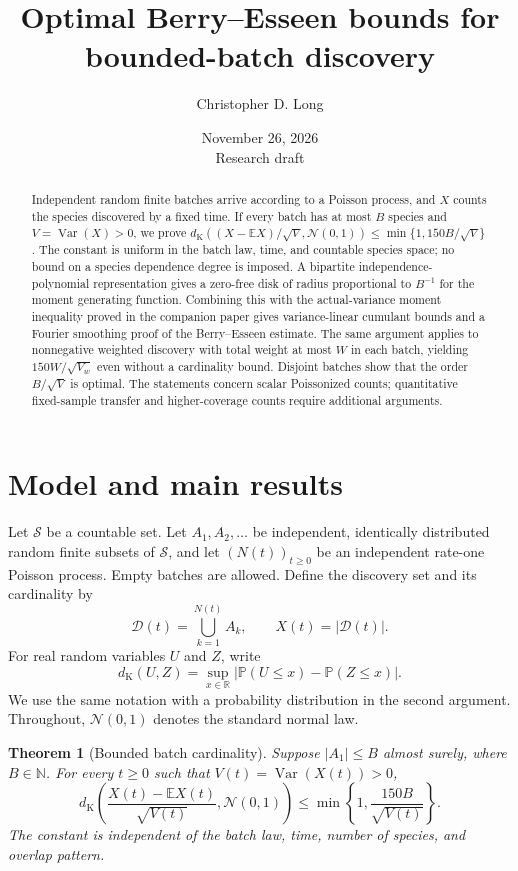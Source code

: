 \documentclass[11pt]{article}
\title{Optimal Berry--Esseen bounds for bounded-batch discovery}
\author{Christopher D. Long}
\date{November 26, 2026\\[3pt]\small Research draft}
\numberwithin{equation}{section}
\newtheorem{theorem}{Theorem}[section]
\theoremstyle{remark}
\newcommand{\E}{\mathbb E}
\newcommand{\Pp}{\mathbb P}
\newcommand{\N}{\mathbb N}
\newcommand{\R}{\mathbb R}
\newcommand{\Var}{\operatorname{Var}}
\newcommand{\dK}{d_{\mathrm K}}
\newcommand{\Normal}{\mathcal N(0,1)}
\begin{document}
\maketitle

\begin{abstract}
Independent random finite batches arrive according to a Poisson process, and
$X$ counts the species discovered by a fixed time. If every batch has at most
$B$ species and $V=\Var(X)>0$, we prove
$\dK((X-\E X)/\sqrt V,\Normal)\le\min\{1,150B/\sqrt V\}$.
The constant is uniform in the batch law, time, and countable species space;
no bound on a species dependence degree is imposed. A bipartite
independence-polynomial representation gives a zero-free disk of radius
proportional to $B^{-1}$ for the moment generating function. Combining this
with the actual-variance moment inequality proved in the companion paper
gives variance-linear cumulant bounds and a Fourier smoothing proof of the
Berry--Esseen estimate. The same argument applies to nonnegative weighted
discovery with total weight at most $W$ in each batch, yielding
$150W/\sqrt{V_w}$ even without a cardinality bound. Disjoint batches show that
the order $B/\sqrt V$ is optimal. The statements concern scalar Poissonized
counts; quantitative fixed-sample transfer and higher-coverage counts require
additional arguments.
\end{abstract}

\section{Model and main results}\label{sec:main}

Let $\mathcal S$ be a countable set. Let $A_1,A_2,\ldots$ be independent,
identically distributed random finite subsets of $\mathcal S$, and let
$(N(t))_{t\ge0}$ be an independent rate-one Poisson process. Empty batches are
allowed. Define the discovery set and its cardinality by
\[
 \mathcal D(t)=\bigcup_{k=1}^{N(t)}A_k,
 \qquad X(t)=|\mathcal D(t)|.
\]
For real random variables $U$ and $Z$, write
\[
 \dK(U,Z)=\sup_{x\in\R}|\Pp(U\le x)-\Pp(Z\le x)|.
\]
We use the same notation with a probability distribution in the second
argument. Throughout, $\Normal$ denotes the standard normal law.

\begin{theorem}[Bounded batch cardinality]\label{thm:unweighted}
Suppose $|A_1|\le B$ almost surely, where $B\in\N$. For every $t\ge0$ such
that $V(t)=\Var(X(t))>0$,
\begin{equation}\label{eq:mainBE}
 \dK\left(\frac{X(t)-\E X(t)}{\sqrt{V(t)}},\Normal\right)
 \le\min\left\{1,\frac{150B}{\sqrt{V(t)}}\right\}.
\end{equation}
The constant is independent of the batch law, time, number of species, and
overlap pattern.
\end{theorem}
\end{document}
